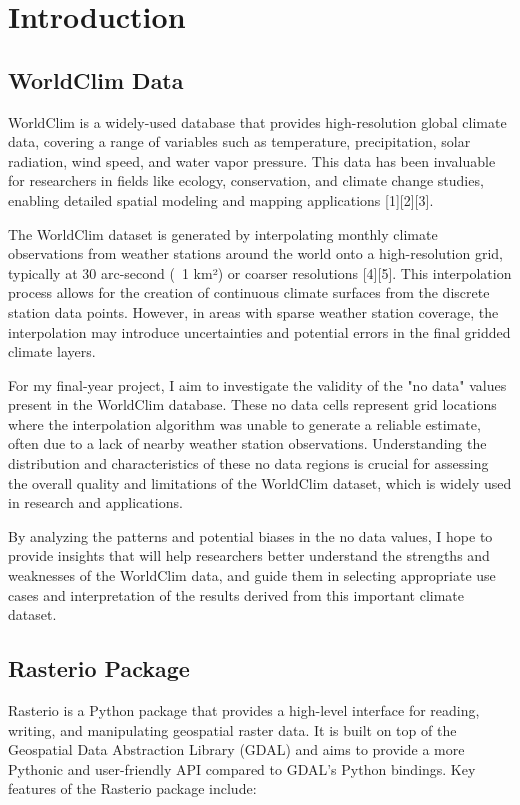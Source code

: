 \documentclass[a4paper,14pt] {report}
\begin{document}
	\chapter{Introduction}
	\section{WorldClim Data}
	WorldClim is a widely-used database that provides high-resolution global climate data, covering a range of variables such as temperature, precipitation, solar radiation, wind speed, and water vapor pressure. This data has been invaluable for researchers in fields like ecology, conservation, and climate change studies, enabling detailed spatial modeling and mapping applications [1][2][3].
			
	The WorldClim dataset is generated by interpolating monthly climate observations from weather stations around the world onto a high-resolution grid, typically at 30 arc-second (~1 km²) or coarser resolutions [4][5]. This interpolation process allows for the creation of continuous climate surfaces from the discrete station data points. However, in areas with sparse weather station coverage, the interpolation may introduce uncertainties and potential errors in the final gridded climate layers.
			
	For my final-year project, I aim to investigate the validity of the "no data" values present in the WorldClim database. These no data cells represent grid locations where the interpolation algorithm was unable to generate a reliable estimate, often due to a lack of nearby weather station observations. Understanding the distribution and characteristics of these no data regions is crucial for assessing the overall quality and limitations of the WorldClim dataset, which is widely used in research and applications.
			
	By analyzing the patterns and potential biases in the no data values, I hope to provide insights that will help researchers better understand the strengths and weaknesses of the WorldClim data, and guide them in selecting appropriate use cases and interpretation of the results derived from this important climate dataset.
		
	\section{Rasterio Package}
	Rasterio is a Python package that provides a high-level interface for reading, writing, and manipulating geospatial raster data. It is built on top of the Geospatial Data Abstraction Library (GDAL) and aims to provide a more Pythonic and user-friendly API compared to GDAL's Python bindings.
	Key features of the Rasterio package include:
	
\end{document}
